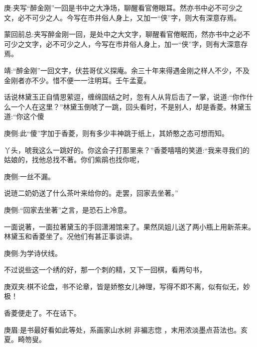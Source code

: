 

\begin{parag}
    \begin{note}庚:夹写“醉金刚”一回是书中之大净场，聊醒看官倦眼耳。然亦书中必不可少之文，必不可少之人。今写在市井俗人身上，又加一“侠”字，则大有深意存焉。\end{note}
\end{parag}


\begin{parag}
    \begin{note}蒙回前总:夹写醉金刚一回，是处中之大文字，聊醒看官倦眠而，然亦书中之必不可少之文字，必不可少之人，今写在市井俗人身上，加一“侠”字，则有大深意存焉。\end{note}
\end{parag}


\begin{parag}
    \begin{note}靖:“醉金刚”一回文字，伏芸哥仗义探庵。余三十年来得遇金刚之样人不少，不及金刚者亦不少。惜不便一一注明耳。壬午孟夏。\end{note}
\end{parag}


\begin{parag}
    话说林黛玉正自情思萦逗，缠绵固结之时，忽有人从背后击了一掌，说道:“你作什么一个人在这里？”林黛玉倒唬了一跳，回头看时，不是别人，却是香菱。林黛玉道:“你这个傻\begin{note}庚侧:此“傻”字加于香菱，则有多少丰神跳于纸上，其娇憨之态可想而知。\end{note}丫头，唬我这么一跳好的。你这会子打那里来？”香菱嘻嘻的笑道:“我来寻我们的姑娘的，找他总找不著。你们紫鹃也找你呢，\begin{note}庚侧:一丝不漏。\end{note}说琏二奶奶送了什么茶叶来给你的。走罢，回家去坐著。”\begin{note}庚侧:“回家去坐著”之言，是恐石上冷意。\end{note}一面说著，一面拉著黛玉的手回潇湘馆来了。果然凤姐儿送了两小瓶上用新茶来。林黛玉和香菱坐了。况他们有甚正事谈讲。\begin{note}庚侧:为学诗伏线。\end{note}不过说些这一个绣的好，那一个刺的精，又下一回棋，看两句书，\begin{note}庚双夹:棋不论盘，书不论章，皆是娇憨女儿神理，写得不即不离，似有似无，妙极！\end{note}香菱便走了。不在话下。\begin{note}庚眉:是书最好看如此等处，系画家山水树 非褊志惚 ，末用浓淡墨点苔法也。亥夏。畸笏叟。\end{note}
\end{parag}


